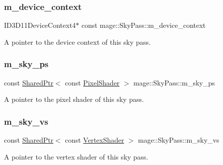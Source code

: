 \subsubsection{\texorpdfstring{m\+\_\+device\+\_\+context}{m\_device\_context}}
{\footnotesize\ttfamily I\+D3\+D11\+Device\+Context4$\ast$ const mage\+::\+Sky\+Pass\+::m\+\_\+device\+\_\+context\hspace{0.3cm}{\ttfamily [private]}}

A pointer to the device context of this sky pass. \hypertarget{classmage_1_1_sky_pass_abe9548ff1e4b3c15ac9004e4ba4ca052}{}\label{classmage_1_1_sky_pass_abe9548ff1e4b3c15ac9004e4ba4ca052} 
\subsubsection{\texorpdfstring{m\+\_\+sky\+\_\+ps}{m\_sky\_ps}}
{\footnotesize\ttfamily const \hyperlink{namespacemage_a1e01ae66713838a7a67d30e44c67703e}{Shared\+Ptr}$<$ const \hyperlink{namespacemage_a27ecaf266420ee7a494d64edc0757129}{Pixel\+Shader} $>$ mage\+::\+Sky\+Pass\+::m\+\_\+sky\+\_\+ps\hspace{0.3cm}{\ttfamily [private]}}

A pointer to the pixel shader of this sky pass. \hypertarget{classmage_1_1_sky_pass_a406ffced453d34b583a7bf975cf7f70f}{}\label{classmage_1_1_sky_pass_a406ffced453d34b583a7bf975cf7f70f} 
\subsubsection{\texorpdfstring{m\+\_\+sky\+\_\+vs}{m\_sky\_vs}}
{\footnotesize\ttfamily const \hyperlink{namespacemage_a1e01ae66713838a7a67d30e44c67703e}{Shared\+Ptr}$<$ const \hyperlink{classmage_1_1_vertex_shader}{Vertex\+Shader} $>$ mage\+::\+Sky\+Pass\+::m\+\_\+sky\+\_\+vs\hspace{0.3cm}{\ttfamily [private]}}

A pointer to the vertex shader of this sky pass. 